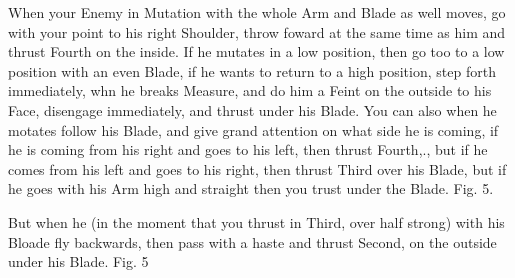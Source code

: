 \newpage


\newpage

When your Enemy in Mutation with the whole Arm and Blade as well
moves, go with your point to his right Shoulder, throw foward at the
same time as him and thrust Fourth on the inside. If he mutates in a
low position, then go too to a low position with an even Blade, if he
wants to return to a high position, step forth immediately, whn he
breaks Measure, and do him a Feint on the outside to his Face,
disengage immediately, and thrust under his Blade. You can also when
he motates follow his Blade, and give grand attention on what side he
is coming, if he is coming from his right and goes to his left, then
thrust Fourth,., but if he comes from his left and goes to his right,
then thrust Third over his Blade, but if he goes with his Arm high and
straight then you trust under the Blade. Fig. 5.

\exercise{}

But when he (in the moment that you thrust in Third, over half strong)
with his Bloade fly backwards, then pass with a haste and thrust
Second, on the outside under his Blade. Fig. 5

\exercise{}

